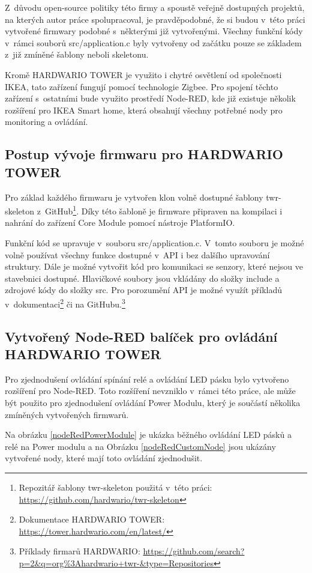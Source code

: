 Z~důvodu open-source politiky této firmy a spoustě veřejně dostupných projektů, na kterých autor práce spolupracoval, je pravděpodobné, že si budou v~této práci vytvořené firmwary podobné s~některými již vytvořenými. Všechny funkční kódy v~rámci souborů src/application.c byly vytvořeny od začátku pouze se základem z~již zmíněné šablony neboli skeletonu. 

Kromě HARDWARIO TOWER je využito i chytré osvětlení od společnosti IKEA, tato zařízení fungují pomocí technologie Zigbee. Pro spojení těchto zařízení s~ostatními bude využito prostředí Node-RED, kde již existuje několik rozšíření pro IKEA Smart home, která obsahují všechny potřebné nody pro monitoring a ovládání.

\subsection*{Postup vývoje firmwaru pro HARDWARIO TOWER}
Pro základ každého firmwaru je vytvořen klon volně dostupné šablony twr-skeleton z~GitHub\footnote{Repozitář šablony twr-skeleton použitá v~této práci: \url{https://github.com/hardwario/twr-skeleton}}. Díky této šabloně je firmware připraven na kompilaci i nahrání do zařízení Core Module pomocí nástroje PlatformIO.

Funkční kód se upravuje v~souboru src/application.c. V~tomto souboru je možné volně používat všechny funkce dostupné v~API i bez dalšího upravování struktury. 
Dále je možné vytvořit kód pro komunikaci se senzory, které nejsou ve stavebnici dostupné. Hlavičkové soubory jsou vkládány do složky include a zdrojové kódy do složky src.
Pro porozumění API je možné využít příkladů v~dokumentaci\footnote{Dokumentace HARDWARIO TOWER: \url{https://tower.hardwario.com/en/latest/}} či na GitHubu.\footnote{Příklady firmarů HARDWARIO: \url{https://github.com/search?p=2\&q=org\%3Ahardwario+twr-\&type=Repositories}}

\subsection*{Vytvořený Node-RED balíček pro ovládání HARDWARIO TOWER}
Pro zjednodušení ovládání spínání relé a ovládání LED pásku bylo vytvořeno rozšíření pro Node-RED. Toto rozšíření nevzniklo v~rámci této práce, ale může být použito pro zjednodušení ovládání Power Modulu, který je součástí několika zmíněných vytvořených firmwarů.

Na obrázku \ref{nodeRedPowerModule} je ukázka běžného ovládání LED pásků a relé na Power modulu a na Obrázku \ref{nodeRedCustomNode} jsou ukázány vytvořené nody, které mají toto ovládání zjednodušit.


